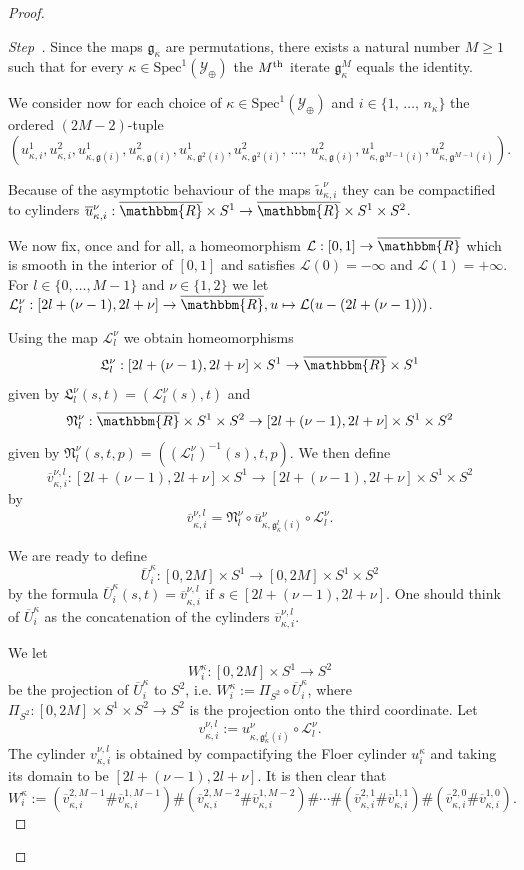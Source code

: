 \documentclass[AHL,Unicode,longabstracts,published]{cedram}
\newcommand{\R}{\mathbbm{R}}
\newcommand{\Spec}{\mathrm{Spec}}
\newcommand{\clY}{\mathcal{Y}}
\newcommand{\clL}{\mathcal{L}}
\newcommand{\fkg}{\mathfrak{g}}
\newcommand{\fkL}{\mathfrak{L}}
\newcommand{\fkN}{\mathfrak{N}}
\newcounter{stepcount}
\newenvironment{step}{\refstepcounter{stepcount}\begin{proof}[Step~\thestepcount]}{\let\qed\relax\end{proof}}
\begin{document}
\begin{proof}
\begin{step}\label{step3.1}
Since the maps $\fkg_{\kappa}$ are permutations, there exists a natural number $M\geq 1$ such that for every $\kappa \in \Spec^1(\clY_\oplus)$ the $M^{\rm th}$ iterate $\fkg^M_{\kappa} $ equals the identity.


We consider now for each choice of $\kappa \in \Spec^1(\clY_\oplus)$ and $i \in \{1,\,\ldots,\,n_\kappa\}$ the ordered $(2M-2)$-tuple
\[
\left(u^1_{\kappa,i},u^2_{\kappa,i}, u^1_{\kappa,\fkg(i)},u^2_{\kappa,\fkg(i)},u^1_{\kappa,\fkg^2(i)},u^2_{\kappa,\fkg^2(i)},\,\ldots,\,u^2_{\kappa,\fkg(i)},u^1_{\kappa,\fkg^{M-1}(i)},u^2_{\kappa,\fkg^{M-1}(i)}\right).
\]

Because of the asymptotic behaviour of the maps $\widetilde{u}^\nu_{\kappa,i}$ they can be compactified to cylinders $\overline{u}^\nu_{\kappa,i}: \overline{\R} \times S^1 \to \overline{\R} \times S^1 \times S^2 $.

We now fix, once and for all, a homeomorphism $\clL: [0,{1}] \to \overline{\R}$ which is smooth in the interior of $[0,1]$ and satisfies $\clL(0)= -\infty$ and $\clL(1)= +\infty$. For $l \in \{0,\ldots,M-1\}$ and $\nu \in \{1,2\}$ we let $\clL^\nu_l: [2l + (\nu -1),2l + \nu] \to \overline{\R}, u \mapsto \clL(u - (2l + (\nu-1)))$.


Using the map $\clL^\nu_l$ we obtain homeomorphisms
\[
{\fkL^\nu_l}: [2l + (\nu-1),2l + \nu] \times S^1 \to \overline{\R} \times S^1
\]
given by ${\fkL^\nu_l}(s,t) = ({\clL^\nu_l}(s),t)$ and
\[
{\fkN^\nu_l}: \overline{\R} \times S^1 \times S^2 \to [2l + (\nu-1),2l + \nu] \times S^1 \times S^2
\]
given by $\fkN^\nu_l(s,t,p) = ((\clL^\nu_l)^{-1}(s),t,p)$.
We then define
\[
\overline{v}^{\nu,l}_{\kappa,i}: [2l + (\nu-1),2l + \nu] \times S^1 \to [2l + (\nu-1),2l + \nu] \times S^1 \times S^2
\]
by
\[
\overline{v}^{\nu,l}_{\kappa,i} = \fkN^\nu_l \circ \overline{u}^\nu_{\kappa,\fkg^l_\kappa(i)} \circ {\clL^\nu_l}.
\]

We are ready to define
\[
\overline{U}^\kappa_i: [0,2M] \times S^1 \to [0,2M] \times S^1 \times S^2
\]
by the formula $\overline{U}^\kappa_i(s,t)= \overline{v}^{\nu,l}_{\kappa,i}$ if $s \in [2l + (\nu-1),2l + \nu]$. One should think of $\overline{U}^\kappa_i$ as the concatenation of the cylinders $\overline{v}^{\nu,l}_{\kappa,i}$.


We let
\[
{W}^{\kappa}_i: [0,2M] \times S^1 \to S^2
\]
be the projection of $\overline{U}^\kappa_i$ to $S^2$, i.e. $ {W}^{\kappa}_i := \Pi_{S^2} \circ \overline{U}^\kappa_i$, where $\Pi_{S^2}: [0,2M] \times S^1 \times S^2 \to S^2 $ is the projection onto the third coordinate. Let
\[
{v}^{\nu,l}_{\kappa,i} := {u}^\nu_{\kappa,\fkg^l_\kappa(i)} \circ {\clL^\nu_l}.
\]
The cylinder ${v}^{\nu,l}_{\kappa,i}$ is obtained by compactifying the Floer cylinder $u^\kappa_{i}$ and taking its domain to be $[2l + (\nu-1),2l + \nu]$. It is then clear that
\[
{W}^{\kappa}_i := \left(\overline{v}^{2,M-1}_{\kappa,i} \# \overline{v}^{1,M-1}_{\kappa,i}\right) \# \left(\overline{v}^{2,M-2}_{\kappa,i} \# \overline{v}^{1,M-2}_{\kappa,i}\right) \# \cdots \# \left(\overline{v}^{2,1}_{\kappa,i} \# \overline{v}^{1,1}_{\kappa,i}\right) \# \left(\overline{v}^{2,0}_{\kappa,i} \# \overline{v}^{1,0}_{\kappa,i}\right).
\]


\end{step}
\end{proof}
\end{document}
